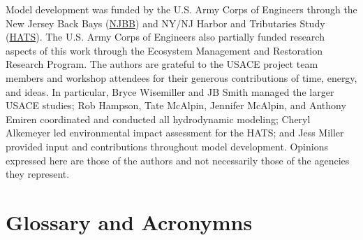 \documentclass[
]{book}
\begin{document}
Model development was funded by the U.S. Army Corps of Engineers through the New Jersey Back Bays (\href{https://www.nap.usace.army.mil/Missions/Civil-Works/New-Jersey-Back-Bays-Coastal-Storm-Risk-Management/}{NJBB}) and NY/NJ Harbor and Tributaries Study (\href{https://www.nan.usace.army.mil/Missions/Civil-Works/Projects-in-New-York/New-York-New-Jersey-Harbor-Tributaries-Focus-Area-Feasibility-Study/}{HATS}). The U.S. Army Corps of Engineers also partially funded research aspects of this work through the Ecosystem Management and Restoration Research Program. The authors are grateful to the USACE project team members and workshop attendees for their generous contributions of time, energy, and ideas. In particular, Bryce Wisemiller and JB Smith managed the larger USACE studies; Rob Hampson, Tate McAlpin, Jennifer McAlpin, and Anthony Emiren coordinated and conducted all hydrodynamic modeling; Cheryl Alkemeyer led environmental impact assessment for the HATS; and Jess Miller provided input and contributions throughout model development. Opinions expressed here are those of the authors and not necessarily those of the agencies they represent.

\hypertarget{glossary-and-acronymns}{%
\section*{Glossary and Acronymns}\label{glossary-and-acronymns}}
\end{document}
